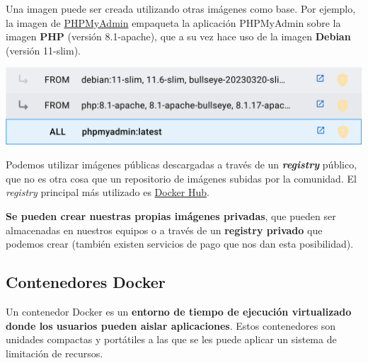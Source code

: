 
Una imagen puede ser creada utilizando otras imágenes como base. Por ejemplo, la imagen de \href{https://hub.docker.com/_/phpmyadmin}{PHPMyAdmin} empaqueta la aplicación PHPMyAdmin sobre la imagen \textbf{PHP} (versión 8.1-apache), que a su vez hace uso de la imagen \textbf{Debian} (versión 11-slim).


\begin{center}
    \includegraphics[width=0.9\linewidth]{img/docker/imagen1.png}
\end{center}

Podemos utilizar imágenes públicas descargadas a través de un \textbf{\textit{registry}} público, que no es otra cosa que un repositorio de imágenes subidas por la comunidad. El \textit{registry} principal más utilizado es \href{https://hub.docker.com/}{Docker Hub}.


\textbf{Se pueden crear nuestras propias imágenes privadas}, que pueden ser almacenadas en nuestros equipos o a través de un \textbf{registry privado} que podemos crear (también existen servicios de pago que nos dan esta posibilidad).


\subsection{Contenedores Docker}
Un contenedor Docker es un \textbf{entorno de tiempo de ejecución virtualizado donde los usuarios pueden aislar aplicaciones}. Estos contenedores son unidades compactas y portátiles a las que se les puede aplicar un sistema de limitación de recursos.


